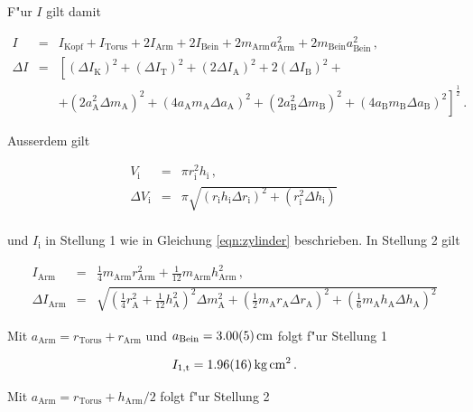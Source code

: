 				F"ur $I$ gilt damit

				\begin{eqnarray*}
					I & = & I_\mathrm{Kopf} + I_\mathrm{Torus} + 2 I_\mathrm{Arm} + 2 I_\mathrm{Bein} + 2 m_\mathrm{Arm}a_\mathrm{Arm}^2 + 2 m_\mathrm{Bein}a_\mathrm{Bein}^2 \,, \\
					\Delta I & = & \left[(\Delta I_\mathrm{K})^2 + (\Delta I_\mathrm{T})^2 + (2 \Delta I_\mathrm{A})^2 + 2(\Delta I_\mathrm{B})^2 +\right. \\
					&& \left. + (2a_\mathrm{A}^2 \Delta m_\mathrm{A})^2 + (4 a_\mathrm{A}m_\mathrm{A} \Delta a_\mathrm{A})^2 + (2a_\mathrm{B}^2 \Delta m_\mathrm{B})^2 + (4 a_\mathrm{B}m_\mathrm{B} \Delta a_\mathrm{B})^2\right]^\frac{1}{2} \,.
				\end{eqnarray*}

				Ausserdem gilt

				\begin{eqnarray*}
					V_\mathrm{i} & = & \pi r_\mathrm{i}^2 h_\mathrm{i} \,, \\
					\Delta V_\mathrm{i} & = & \pi \sqrt{(r_\mathrm{i} h_\mathrm{i} \Delta r_\mathrm{i})^2 + (r_\mathrm{i}^2 \Delta h_\mathrm{i})} \, \\
				\end{eqnarray*}

				und $I_\mathrm{i}$ in Stellung 1 wie in Gleichung \eqref{eqn:zylinder} beschrieben. In Stellung 2 gilt

				\begin{eqnarray*}
					I_\mathrm{Arm} & = & \frac{1}{4}m_\mathrm{Arm}r_\mathrm{Arm}^2 + \frac{1}{12}m_\mathrm{Arm}h_\mathrm{Arm}^2 \,, \\
					\Delta I_\mathrm{Arm} & = & \sqrt{\left(\frac{1}{4}r_\mathrm{A}^2 + \frac{1}{12}h_\mathrm{A}^2\right)^2 \Delta m_\mathrm{A}^2 + \left(\frac{1}{2}m_\mathrm{A}r_\mathrm{A}\Delta r_\mathrm{A}\right)^2 + \left(\frac{1}{6}m_\mathrm{A}h_\mathrm{A}\Delta h_\mathrm{A}\right)^2}
				\end{eqnarray*}

				Mit $a_\mathrm{Arm} = r_\mathrm{Torus} + r_\mathrm{Arm}$ und $a_\mathrm{Bein} = \SI{3.00 (5)}{\centi \meter}$ folgt f"ur Stellung 1

				\begin{equation*}
					I_{1,\mathrm{t}} = \SI{1.96 (16)}{\kilo \gram \centi \meter \squared} \,.
				\end{equation*}

				Mit $a_\mathrm{Arm} = r_\mathrm{Torus} + h_\mathrm{Arm} / 2$ folgt f"ur Stellung 2

